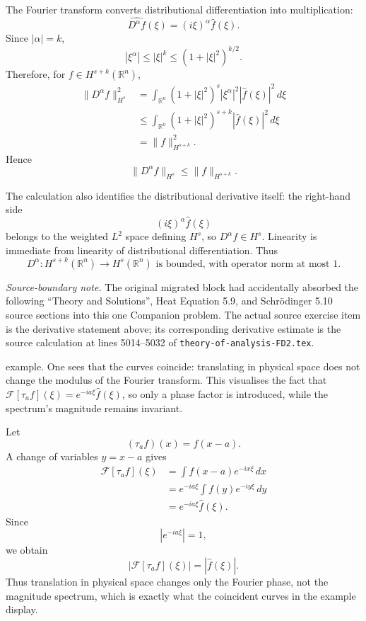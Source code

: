 \begin{solution}
The Fourier transform converts distributional differentiation into
multiplication:
\[
\widehat{D^\alpha f}(\xi)
=
(i\xi)^\alpha\widehat f(\xi).
\]
Since \(|\alpha|=k\),
\[
|\xi^\alpha|
\le
|\xi|^k
\le
(1+|\xi|^2)^{k/2}.
\]
Therefore, for \(f\in H^{s+k}(\mathbb R^n)\),
\[
\begin{aligned}
\|D^\alpha f\|_{H^s}^2
&=
\int_{\mathbb R^n}
(1+|\xi|^2)^s
|\xi^\alpha|^2
|\widehat f(\xi)|^2\,d\xi\\
&\le
\int_{\mathbb R^n}
(1+|\xi|^2)^{s+k}
|\widehat f(\xi)|^2\,d\xi\\
&=
\|f\|_{H^{s+k}}^2.
\end{aligned}
\]
Hence
\[
\boxed{
\|D^\alpha f\|_{H^s}
\le
\|f\|_{H^{s+k}}.
}
\]

The calculation also identifies the distributional derivative itself:
the right-hand side
\[
(i\xi)^\alpha\widehat f(\xi)
\]
belongs to the weighted \(L^2\) space defining \(H^s\), so
\(D^\alpha f\in H^s\). Linearity is immediate from linearity of
distributional differentiation. Thus
\[
\boxed{
D^\alpha:H^{s+k}(\mathbb R^n)\to H^s(\mathbb R^n)
\text{ is bounded, with operator norm at most }1.
}
\]

\medskip
\noindent
\textit{Source-boundary note.}
The original migrated block had accidentally absorbed the following
``Theory and Solutions'', Heat Equation 5.9, and Schrödinger 5.10 source
sections into this one Companion problem. The actual source exercise item is
the derivative statement above; its corresponding derivative estimate is the
source calculation at lines 5014--5032 of
\texttt{theory-of-analysis-FD2.tex}.
\end{solution}

\begin{problem}[CP-III-0011]
\label{prob:cp-iii-0011}
example.
One sees that the curves coincide: translating in physical space does not
change the modulus of the Fourier transform.
This visualises the fact that ${\mathcal F}[\tau_a f](\xi)
= e^{-ia\xi}\widehat{f}(\xi)$, so only a phase factor is introduced, while the
spectrum’s magnitude remains invariant.
\end{problem}

\begin{solution}
Let
\[
(\tau_af)(x)=f(x-a).
\]
A change of variables \(y=x-a\) gives
\[
\begin{aligned}
\mathcal F[\tau_af](\xi)
&=
\int f(x-a)e^{-ix\xi}\,dx\\
&=
e^{-ia\xi}\int f(y)e^{-iy\xi}\,dy\\
&=
e^{-ia\xi}\widehat f(\xi).
\end{aligned}
\]
Since
\[
|e^{-ia\xi}|=1,
\]
we obtain
\[
\boxed{
|\mathcal F[\tau_af](\xi)|
=
|\widehat f(\xi)|.
}
\]
Thus translation in physical space changes only the Fourier phase, not
the magnitude spectrum, which is exactly what the coincident curves in
the example display.
\end{solution}


